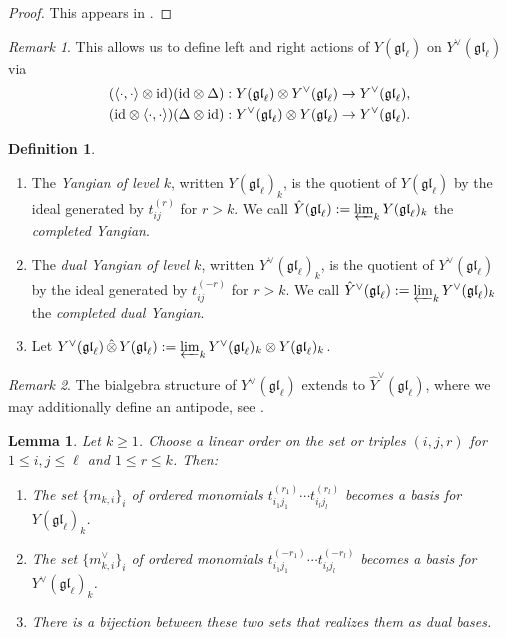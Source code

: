 \documentclass[11pt]{report}
\newtheorem{lemma}[theorem]{Lemma}
\theoremstyle{definition}
\newtheorem{definition}[theorem]{Definition}
\theoremstyle{remark}
\newtheorem*{remark}{Remark}
\theoremstyle{remark}
\newcommand{\id}{\textnormal{id}}
\begin{document}
\begin{proof}
This appears in \cite{article:nazarov:2019}.
\end{proof}

\begin{remark}
This allows us to define left and right actions of $Y(\mathfrak{gl}_\ell)$ on $Y^\vee(\mathfrak{gl}_\ell)$ via
\begin{align*}
(\langle \cdot,\cdot \rangle \otimes \id) (\id \otimes \Delta) &: Y(\mathfrak{gl}_\ell) \otimes Y^\vee(\mathfrak{gl}_\ell) \to Y^\vee(\mathfrak{gl}_\ell), \\
(\id \otimes \langle \cdot,\cdot \rangle) (\Delta \otimes \id) &: Y^\vee(\mathfrak{gl}_\ell) \otimes Y(\mathfrak{gl}_\ell) \to Y^\vee(\mathfrak{gl}_\ell).
\end{align*}
\end{remark}

\begin{definition}
\begin{enumerate}[label=(\roman*)]
\item The \emph{Yangian of level $k$}, written $Y(\mathfrak{gl}_\ell)_k$, is the quotient of $Y(\mathfrak{gl}_\ell)$ by the ideal generated by $t_{ij}^{(r)}$ for $r > k$. We call $\hat Y(\mathfrak{gl}_\ell) := \varprojlim_k Y(\mathfrak{gl}_\ell)_k$ the \emph{completed Yangian}.
\item The \emph{dual Yangian of level $k$}, written $Y^\vee(\mathfrak{gl}_\ell)_k$, is the quotient of $Y^\vee(\mathfrak{gl}_\ell)$ by the ideal generated by $t_{ij}^{(-r)}$ for $r > k$. We call $\hat Y^\vee(\mathfrak{gl}_\ell) := \varprojlim_k Y^\vee(\mathfrak{gl}_\ell)_k$ the \emph{completed dual Yangian}.
\item Let $Y^\vee(\mathfrak{gl}_\ell) \operatorname{\hat \otimes} Y(\mathfrak{gl}_\ell) := \varprojlim_k Y^\vee(\mathfrak{gl}_\ell)_k \otimes Y(\mathfrak{gl}_\ell)_k$.
\end{enumerate}
\end{definition}

\begin{remark}
The bialgebra structure of $Y^\vee(\mathfrak{gl}_\ell)$ extends to $\hat Y^\vee(\mathfrak{gl}_\ell)$, where we may additionally define an antipode, see \cite{article:nazarov:2019}.
\end{remark}

\begin{lemma}
Let $k \geq 1$. Choose a linear order on the set or triples $(i,j,r)$ for $1 \leq i,j \leq \ell$ and $1 \leq r \leq k$. Then:
\begin{enumerate}[label=(\roman*)]
\item The set $\{ m_{k,i} \}_i$ of ordered monomials $t_{i_1 j_1}^{(r_1)} \cdots t_{i_l j_l}^{(r_l)}$ becomes a basis for $Y(\mathfrak{gl}_\ell)_k$.
\item The set $\{ m_{k,i}^\vee \}_i$ of ordered monomials $t_{i_1 j_1}^{(-r_1)} \cdots t_{i_l j_l}^{(-r_l)}$ becomes a basis for $Y^\vee(\mathfrak{gl}_\ell)_k$.
\item There is a bijection between these two sets that realizes them as dual bases.
\end{enumerate}
\end{lemma}
\end{document}
